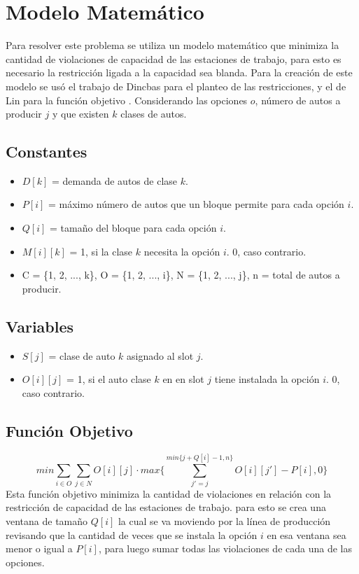 \documentclass[letter, 10pt]{article}
\begin{document}
\section{Modelo Matem\'atico}
Para resolver este problema se utiliza un modelo matem\'atico que minimiza la cantidad de violaciones de capacidad de las estaciones de trabajo, para esto es necesario la restricci\'on ligada a la capacidad sea blanda. Para la creaci\'on de este modelo se us\'o el trabajo de Dincbas \cite{Dincbas} para el planteo de las restricciones, y el de Lin para la funci\'on objetivo \cite{Lin}. Considerando las opciones $o$, n\'umero de autos a producir $j$ y que existen $k$ clases de autos.
\subsection{Constantes}
\begin{itemize}
    \item $D[k]$ = demanda de autos de clase $k$.
    \item $P[i]$ = m\'aximo n\'umero de autos que un bloque permite para cada opci\'on $i$.
    \item $Q[i]$ = tama\~{n}o del bloque para cada opci\'on $i$.
    \item $M[i][k]$ = 1, si la clase $k$ necesita la opci\'on $i$. 0, caso contrario.
    \item C = \{1, 2, ..., k\}, O = \{1, 2, ..., i\}, N = \{1, 2, ..., j\}, n = total de autos a producir.
\end{itemize}

\subsection{Variables}
\begin{itemize}

    \item $S[j]$ = clase de auto $k$ asignado al slot $j$.
    \item $O[i][j]$ = 1, si el auto clase $k$ en en slot $j$ tiene instalada la opci\'on $i$. 0, caso contrario.
\end{itemize}

\subsection{Funci\'on Objetivo}

\begin{equation}
    min\sum_{i \in O}^{}\sum_{j \in N}^{} O[i][j] \cdot max\{\sum_{j'=j}^{min\{j+Q[i]-1,n\}} O[i][j'] - P[i], 0\}
\end{equation}
Esta funci\'on objetivo minimiza la cantidad de violaciones en relaci\'on con la restricci\'on de capacidad de las estaciones de trabajo. para esto se crea una ventana de tama\~{n}o $Q[i]$ la cual se va moviendo por la l\'inea de producci\'on revisando que la cantidad de veces que se instala la opci\'on $i$ en esa ventana sea menor o igual a $P[i]$, para luego sumar todas las violaciones de cada una de las opciones. 
\end{document}
